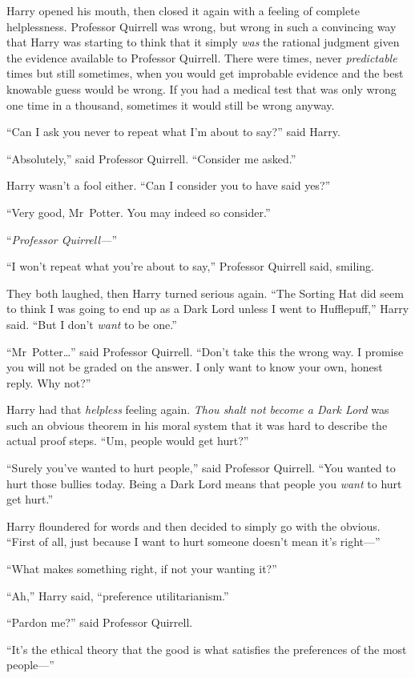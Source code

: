 Harry opened his mouth, then closed it again with a feeling of complete helplessness. Professor Quirrell was wrong, but wrong in such a convincing way that Harry was starting to think that it simply \emph{was} the rational judgment given the evidence available to Professor Quirrell. There were times, never \emph{predictable} times but still sometimes, when you would get improbable evidence and the best knowable guess would be wrong. If you had a medical test that was only wrong one time in a thousand, sometimes it would still be wrong anyway.

“Can I ask you never to repeat what I’m about to say?” said Harry.

“Absolutely,” said Professor Quirrell. “Consider me asked.”

Harry wasn’t a fool either. “Can I consider you to have said yes?”

“Very good, Mr~Potter. You may indeed so consider.”

“\emph{Professor Quirrell—}”

“I won’t repeat what you’re about to say,” Professor Quirrell said, smiling.

They both laughed, then Harry turned serious again. “The Sorting Hat did seem to think I was going to end up as a Dark Lord unless I went to Hufflepuff,” Harry said. “But I don’t \emph{want} to be one.”

“Mr~Potter…” said Professor Quirrell. “Don’t take this the wrong way. I promise you will not be graded on the answer. I only want to know your own, honest reply. Why not?”

Harry had that \emph{helpless} feeling again. \emph{Thou shalt not become a Dark Lord} was such an obvious theorem in his moral system that it was hard to describe the actual proof steps. “Um, people would get hurt?”

“Surely you’ve wanted to hurt people,” said Professor Quirrell. “You wanted to hurt those bullies today. Being a Dark Lord means that people you \emph{want} to hurt get hurt.”

Harry floundered for words and then decided to simply go with the obvious. “First of all, just because I want to hurt someone doesn’t mean it’s right—”

“What makes something right, if not your wanting it?”

“Ah,” Harry said, “preference utilitarianism.”

“Pardon me?” said Professor Quirrell.

“It’s the ethical theory that the good is what satisfies the preferences of the most people—”

